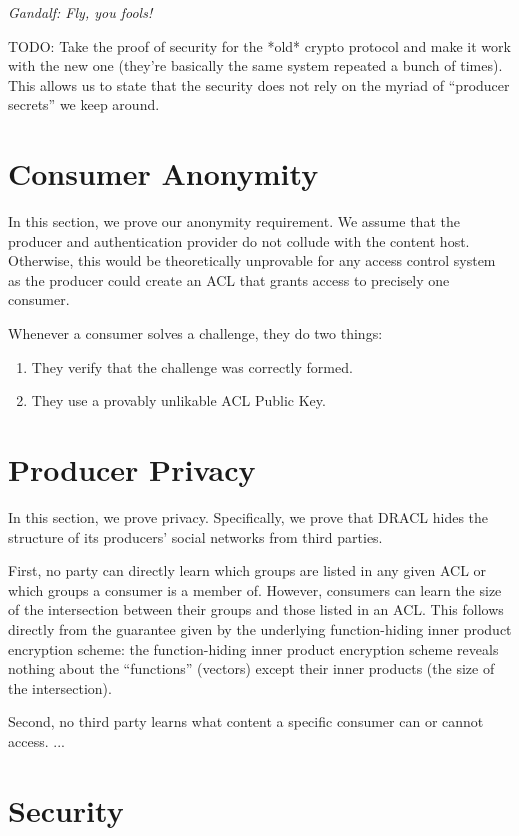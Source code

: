 \documentclass[pdftex,12pt,a4papaer,twoside,notitlepage]{report}
\begin{document}
\emph{Gandalf: Fly, you fools!}

TODO: Take the proof of security for the *old* crypto protocol and make it work
with the new one (they're basically the same system repeated a bunch of times).
This allows us to state that the security does not rely on the myriad of
``producer secrets'' we keep around.

\section{Consumer Anonymity}

In this section, we prove our anonymity requirement. We assume that the producer
and authentication provider do not collude with the content host. Otherwise,
this would be theoretically unprovable for any access control system as the
producer could create an ACL that grants access to precisely one consumer.

Whenever a consumer solves a challenge, they do two things:

\begin{enumerate}
\item They verify that the challenge was correctly formed.
\item They use a provably unlikable ACL Public Key.
\end{enumerate}

\section{Producer Privacy}

In this section, we prove privacy. Specifically, we prove that DRACL hides the
structure of its producers' social networks from third parties.

First, no party can directly learn which groups are listed in any given ACL or
which groups a consumer is a member of. However, consumers can learn the size of
the intersection between their groups and those listed in an ACL. This follows
directly from the guarantee given by the underlying function-hiding inner
product encryption scheme: the function-hiding inner product encryption scheme
reveals nothing about the ``functions'' (vectors) except their inner products
(the size of the intersection).

Second, no third party learns what content a specific consumer can or cannot
access. ...

\section{Security}
\end{document}
